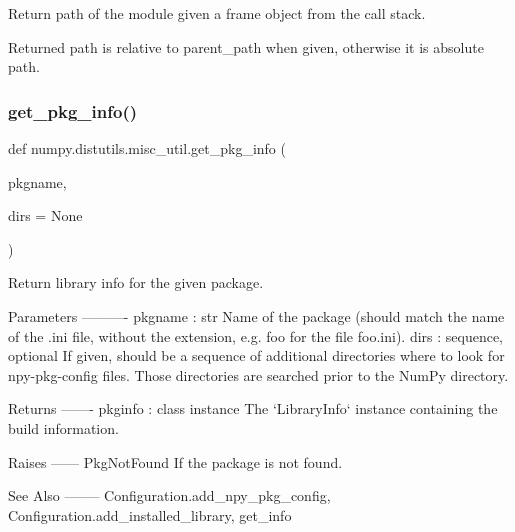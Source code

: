 \begin{DoxyVerb}Return path of the module given a frame object from the call stack.

Returned path is relative to parent_path when given,
otherwise it is absolute path.
\end{DoxyVerb}
 \mbox{\label{namespacenumpy_1_1distutils_1_1misc__util_a28a63bf59c3940a428430834e8e2030a}} 
\subsubsection{\texorpdfstring{get\+\_\+pkg\+\_\+info()}{get\_pkg\_info()}}
{\footnotesize\ttfamily def numpy.\+distutils.\+misc\+\_\+util.\+get\+\_\+pkg\+\_\+info (\begin{DoxyParamCaption}\item[{}]{pkgname,  }\item[{}]{dirs = {\ttfamily None} }\end{DoxyParamCaption})}

\begin{DoxyVerb}Return library info for the given package.

Parameters
----------
pkgname : str
    Name of the package (should match the name of the .ini file, without
    the extension, e.g. foo for the file foo.ini).
dirs : sequence, optional
    If given, should be a sequence of additional directories where to look
    for npy-pkg-config files. Those directories are searched prior to the
    NumPy directory.

Returns
-------
pkginfo : class instance
    The `LibraryInfo` instance containing the build information.

Raises
------
PkgNotFound
    If the package is not found.

See Also
--------
Configuration.add_npy_pkg_config, Configuration.add_installed_library,
get_info\end{DoxyVerb}
 \mbox{\label{namespacenumpy_1_1distutils_1_1misc__util_a53fb9eaf37aae9882c1e7902ca5d4019}} 
